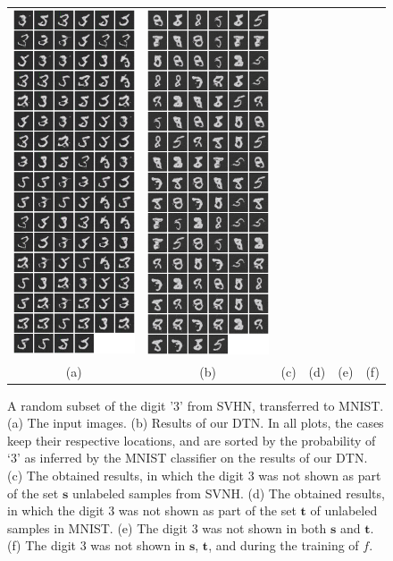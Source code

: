\documentclass{article} %
\begin{document}
\begin{figure}[H]
\begin{tabular}{c@{~}c@{~}c@{~}c@{~}c@{~}c}
\includegraphics[width=0.1597\linewidth]{3_no_adaptation_at_all_sorted_by_vanilla.png}&
 \includegraphics[width=0.1597\linewidth]{3_neverseen_sorted_by_vanilla.png}\\
 (a)&(b)&(c)&(d)&(e)&(f)
 \end{tabular}
 \caption{\label{fig:drop3} A random subset of the digit '3' from SVHN, transferred to MNIST. (a) The input images. (b) Results of our DTN. In all plots, the cases keep their respective locations, and are sorted by the probability of `3' as inferred by the MNIST classifier on the results of our DTN. (c) The obtained results, in which the digit 3 was not shown as part of the set $\mathbf s$ unlabeled samples from SVNH.  (d) The obtained results, in which the digit 3 was not shown as part of the set $\mathbf t$ of unlabeled samples in MNIST. (e) The digit 3 was not shown in both $\mathbf s$ and $\mathbf t$. (f) The digit 3 was not shown in $\mathbf s$, $\mathbf t$, and during the training of $f$.}
\end{figure}
\end{document}
